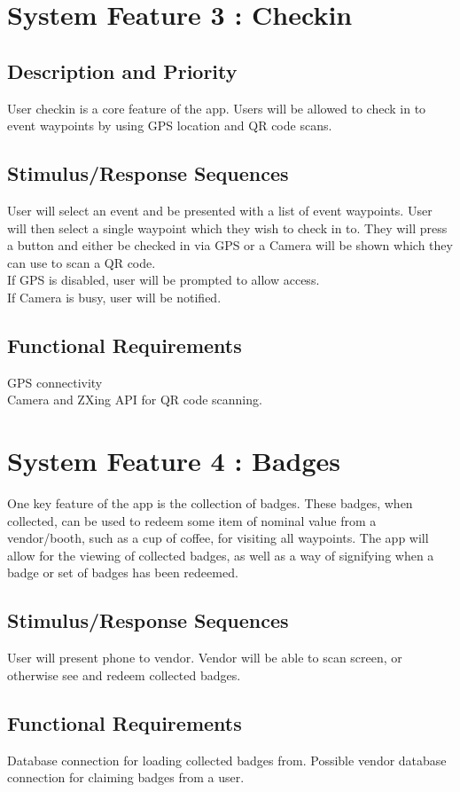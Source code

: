 \documentclass{scrreprt}
\begin{document}
\section{System Feature 3 : Checkin}

\subsection{Description and Priority}
User checkin is a core feature of the app. Users will be allowed to check in to event waypoints
by using GPS location and QR code scans.

\subsection{Stimulus/Response Sequences}
User will select an event and be presented with a list of event waypoints. User will then
select a single waypoint which they wish to check in to. They will press a button and either
be checked in via GPS or a Camera will be shown which they can use to scan a QR code. \\
If GPS is disabled, user will be prompted to allow access. \\
If Camera is busy, user will be notified.

\subsection{Functional Requirements}
GPS connectivity \\
Camera and ZXing API for QR code scanning.

\section{System Feature 4 : Badges}
One key feature of the app is the collection of badges. These badges, when collected,
can be used to redeem some item of nominal value from a vendor/booth, such as a 
cup of coffee, for visiting all waypoints. The app will allow for the viewing of collected 
badges, as well as a way of signifying when a badge or set of badges has been redeemed.

\subsection{Stimulus/Response Sequences}
User will present phone to vendor. Vendor will be able to scan screen, or otherwise 
see and redeem collected badges.

\subsection{Functional Requirements}
Database connection for loading collected badges from. Possible vendor database connection 
for claiming badges from a user.
\end{document}
